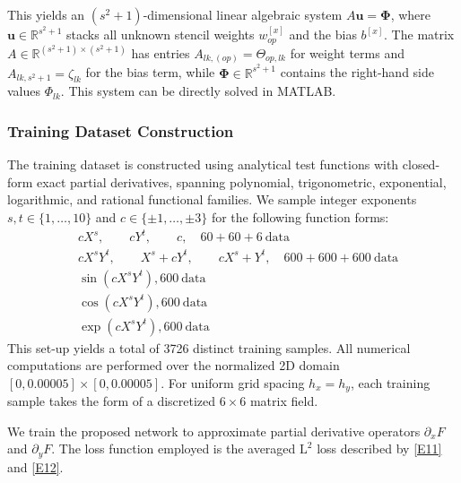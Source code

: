 \documentclass[pdflatex,sn-mathphys-num]{sn-jnl}%
\theoremstyle{thmstyleone}%
\theoremstyle{thmstyletwo}%
\theoremstyle{thmstylethree}%
\begin{document}
  This yields an $(s^2+1)$-dimensional linear algebraic system $A\boldsymbol{u}=\boldsymbol{\Phi}$, where $\boldsymbol{u}\in\mathbb{R}^{s^2+1}$ stacks all unknown stencil weights $w_{op}^{[x]}$ and the bias $b^{[x]}$. The matrix $A\in\mathbb{R}^{(s^2+1)\times(s^2+1)}$ has entries $A_{lk,(op)}=\Theta_{op,lk}$ for weight terms and $A_{lk,s^2+1}=\zeta_{lk}$ for the bias term, while $\boldsymbol{\Phi}\in\mathbb{R}^{s^2+1}$ contains the right-hand side values $\Phi_{lk}$. This system can be directly solved in MATLAB.
  
  
\subsubsection{Training Dataset Construction}\label{subsec431}
The training dataset is constructed using analytical test functions with closed-form exact partial derivatives, spanning polynomial, trigonometric, exponential, logarithmic, and rational functional families. We sample integer exponents $s,t \in \{1,\dots,10\}$ and $ c\in \{\pm1,\dots,\pm3\}$ for the following function forms:
\begin{align*}
&cX^s,\quad \quad  cY^t,\quad \quad   c,\quad 60+60+6\ \text{data} \\
&cX^s Y^t,\quad \quad X^s + cY^t, \quad \quad cX^s + Y^t,\quad 600+600+600\ \text{data}\\
&\sin(cX^s Y^t), 600\ \text{data} \\%
&\cos(cX^s Y^t), 600\ \text{data} \\ %
&\exp(cX^s Y^t), 600\ \text{data} %
\end{align*}
This set-up yields a total of 3726 distinct training samples. All numerical computations are performed over the normalized 2D domain $[0,0.00005]\times [0,0.00005]$. For uniform grid spacing $h_x=h_y$, each training sample takes the form of a discretized $6\times 6$ matrix field.

We train the proposed network to approximate partial derivative operators $\partial_x F$ and $\partial_y F$.
The loss function employed is the averaged $\mathrm{L}^2$ loss described by  \eqref{E11} and \eqref{E12}.
\end{document}
